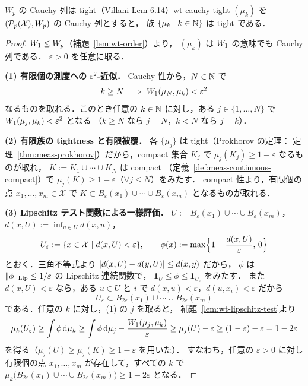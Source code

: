 \begin{lemma}{$W_p$ の Cauchy 列は tight（Villani Lem 6.14）}{wt-cauchy-tight}
  $(\mu_k)$ を $(\mathcal{P}_{p}(\mathcal{X}),W_p)$ の Cauchy 列とすると，
  族 $\{\mu_k\mid k\in\mathbb{N}\}$ は tight である．
\end{lemma}

\begin{proof}
  $W_1\leq W_p$（補題~\ref{lem:wt-order}）より，
  $(\mu_k)$ は $W_1$ の意味でも Cauchy 列である．
  $\varepsilon>0$ を任意に取る．

  \textbf{(1) 有限個の測度への $\varepsilon^2$-近似．}
  Cauchy 性から，$N\in\mathbb{N}$ で
  \[
    k\geq N\implies W_1(\mu_N,\mu_k)<\varepsilon^2
  \]
  なるものを取れる．このとき任意の $k\in\mathbb{N}$ に対し，ある
  $j\in\{1,\dots,N\}$ で $W_1(\mu_j,\mu_k)<\varepsilon^2$ となる
  （$k\geq N$ なら $j=N$，$k<N$ なら $j=k$）．

  \textbf{(2) 有限族の tightness と有限被覆．}
  各 $\{\mu_j\}$ は tight（Prokhorov の定理：
  定理~\ref{thm:meas-prokhorov}）だから，compact 集合
  $K_j$ で $\mu_j(K_j)\geq1-\varepsilon$ なるものが取れ，
  $K:=K_1\cup\cdots\cup K_N$ は compact
  （定義~\ref{def:meas-continuous-compact}）で
  $\mu_j(K)\geq1-\varepsilon$（$\forall j\leq N$）をみたす．
  compact 性より，有限個の点 $x_1,\dots,x_m\in\mathcal{X}$ で
  $K\subset B_\varepsilon(x_1)\cup\cdots\cup B_\varepsilon(x_m)$
  となるものが取れる．

  \textbf{(3) Lipschitz テスト関数による一様評価．}
  $U:=B_\varepsilon(x_1)\cup\cdots\cup B_\varepsilon(x_m)$，
  $d(x,U):=\inf_{u\in U}d(x,u)$，
  \[
    U_\varepsilon:=\{x\in\mathcal{X}\mid d(x,U)<\varepsilon\},
    \qquad
    \phi(x):=\max\Bigl\{1-\frac{d(x,U)}{\varepsilon},\,0\Bigr\}
  \]
  とおく．三角不等式より $\lvert d(x,U)-d(y,U) \rvert\leq d(x,y)$ だから，
  $\phi$ は $\lVert \phi \rVert_{\operatorname{Lip}}\leq1/\varepsilon$ の
  Lipschitz 連続関数で，
  $\mathbf{1}_U\leq\phi\leq\mathbf{1}_{U_\varepsilon}$ をみたす．
  また $d(x,U)<\varepsilon$ なら，ある $u\in U$ と $i$ で
  $d(x,u)<\varepsilon$，$d(u,x_i)<\varepsilon$ だから
  \[
    U_\varepsilon\subset
    B_{2\varepsilon}(x_1)\cup\cdots\cup B_{2\varepsilon}(x_m)
  \]
  である．任意の $k$ に対し，(1) の $j$ を取ると，
  補題~\ref{lem:wt-lipschitz-test}より
  \[
    \mu_k(U_\varepsilon)
    \geq\int\phi\,\mathrm{d}\mu_k
    \geq\int\phi\,\mathrm{d}\mu_j-\frac{W_1(\mu_j,\mu_k)}{\varepsilon}
    \geq\mu_j(U)-\varepsilon
    \geq(1-\varepsilon)-\varepsilon
    =1-2\varepsilon
  \]
  を得る（$\mu_j(U)\geq\mu_j(K)\geq1-\varepsilon$ を用いた）．
  すなわち，任意の $\varepsilon>0$ に対し有限個の点
  $x_1,\dots,x_m$ が存在して，すべての $k$ で
  $\mu_k\bigl(B_{2\varepsilon}(x_1)\cup\cdots\cup
  B_{2\varepsilon}(x_m)\bigr)\geq1-2\varepsilon$ となる．


\end{proof}
